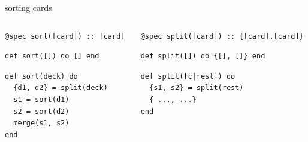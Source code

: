 \begin{frame}[fragile]{sorting cards}

\begin{columns}

 \begin{column}{0.4\linewidth}
\begin{verbatim}
@spec sort([card]) :: [card]
\end{verbatim}
\begin{verbatim}
def sort([]) do [] end
\end{verbatim}
\pause
\begin{verbatim}
def sort(deck) do
  {d1, d2} = split(deck)
  s1 = sort(d1)
  s2 = sort(d2)
  merge(s1, s2)
end
\end{verbatim}
 \end{column}
 
 \pause

 \begin{column}{0.5\linewidth}
\begin{verbatim}
@spec split([card]) :: {[card],[card]}
\end{verbatim}
\pause
\begin{verbatim}
def split([]) do {[], []} end
\end{verbatim}
\begin{verbatim}
def split([c|rest]) do 
  {s1, s2} = split(rest)
  { ..., ...}
end
\end{verbatim}
 \end{column}
\end{columns}

\end{frame}

